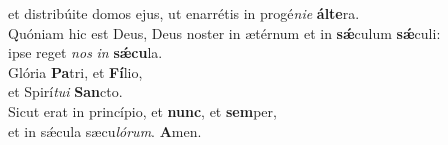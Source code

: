 \evenverse et distribúite domos ejus, ut enarrétis in progé\textit{ni}\textit{e} \textbf{ál}\textbf{te}ra.\\
\oddverse Quóniam hic est Deus, Deus noster in ætérnum et in \textbf{sǽ}culum \textbf{sǽ}culi:~\*\\
\oddverse ipse reget \textit{nos} \textit{in} \textbf{sǽ}\textbf{cu}la.\\
\evenverse Glória \textbf{Pa}tri, et \textbf{Fí}lio,~\*\\
\evenverse et Spirí\textit{tu}\textit{i} \textbf{San}cto.\\
\oddverse Sicut erat in princípio, et \textbf{nunc}, et \textbf{sem}per,~\*\\
\oddverse et in sǽcula sæcu\textit{ló}\textit{rum}. \textbf{A}men.\\
